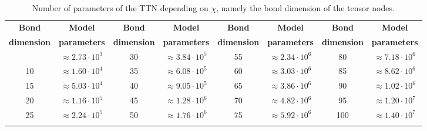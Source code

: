 \documentclass[../main/main.tex]{subfiles}
\begin{document}
\begin{table}[!h]
    \centering
    \begin{tabular}{cc|cc|cc|cc}
        \toprule
        \textbf{Bond} & \textbf{Model} &
        \textbf{Bond} & \textbf{Model} &
        \textbf{Bond} & \textbf{Model} &
        \textbf{Bond} & \textbf{Model} \\
        \textbf{dimension} & \textbf{parameters} &
        \textbf{dimension} & \textbf{parameters} &
        \textbf{dimension} & \textbf{parameters} &
        \textbf{dimension} & \textbf{parameters} \\
        \colrule
        5   & $ \approx 2.73 \cdot 10^{3} $ & 30  & $ \approx 3.84 \cdot 10^{5} $ & 55  & $ \approx 2.34 \cdot 10^{6} $ & 80  & $ \approx 7.18 \cdot 10^{6} $ \\ 
        10  & $ \approx 1.60 \cdot 10^{4} $ & 35  & $ \approx 6.08 \cdot 10^{5} $ & 60  & $ \approx 3.03 \cdot 10^{6} $ & 85  & $ \approx 8.62 \cdot 10^{6} $ \\
        15  & $ \approx 5.03 \cdot 10^{4} $ & 40  & $ \approx 9.05 \cdot 10^{5} $ & 65  & $ \approx 3.86 \cdot 10^{6} $ & 90  & $ \approx 1.02 \cdot 10^{6} $ \\
        20  & $ \approx 1.16 \cdot 10^{5} $ & 45  & $ \approx 1.28 \cdot 10^{6} $ & 70  & $ \approx 4.82 \cdot 10^{6} $ & 95  & $ \approx 1.20 \cdot 10^{7} $ \\ 
        25  & $ \approx 2.24 \cdot 10^{5} $ & 50  & $ \approx 1.76 \cdot 10^{6} $ & 75  & $ \approx 5.92 \cdot 10^{6} $ & 100 & $ \approx 1.40 \cdot 10^{7} $\\  
        \botrule
    \end{tabular}
    \caption{Number of parameters of the TTN depending on \( \chi \), namely the bond dimension of the tensor nodes.}
    \label{tab:results_characterisation_parameters}
\end{table}
\end{document}
